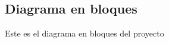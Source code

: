 \documentclass[../informe_krapp.tex]{subfiles}
\begin{document}
\graphicspath{{../images/}}
\subsection{Diagrama en bloques}
Este es el diagrama en bloques del proyecto
\end{document}
